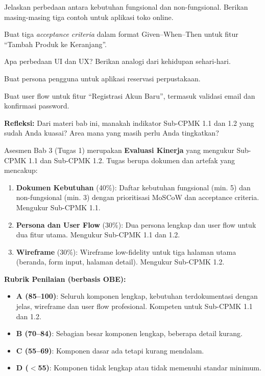 \documentclass[../main.tex]{subfiles}
\begin{document}
\begin{latihan}
  \item Jelaskan perbedaan antara kebutuhan fungsional dan non-fungsional. Berikan masing-masing tiga contoh untuk aplikasi toko online.
  \item Buat tiga \textit{acceptance criteria} dalam format Given--When--Then untuk fitur ``Tambah Produk ke Keranjang''.
  \item Apa perbedaan UI dan UX? Berikan analogi dari kehidupan sehari-hari.
  \item Buat persona pengguna untuk aplikasi reservasi perpustakaan.
  \item Buat user flow untuk fitur ``Registrasi Akun Baru'', termasuk validasi email dan konfirmasi password.
  \item \textbf{Refleksi:} Dari materi bab ini, manakah indikator Sub-CPMK 1.1 dan 1.2 yang sudah Anda kuasai? Area mana yang masih perlu Anda tingkatkan?
\end{latihan}

\begin{asesmen}
Asesmen Bab 3 (Tugas 1) merupakan \textbf{Evaluasi Kinerja} yang mengukur Sub-CPMK 1.1 dan Sub-CPMK 1.2. Tugas berupa dokumen dan artefak yang mencakup:
\begin{enumerate}
  \item \textbf{Dokumen Kebutuhan} (40\%): Daftar kebutuhan fungsional (min. 5) dan non-fungsional (min. 3) dengan prioritisasi MoSCoW dan acceptance criteria. Mengukur Sub-CPMK 1.1.
  \item \textbf{Persona dan User Flow} (30\%): Dua persona lengkap dan user flow untuk dua fitur utama. Mengukur Sub-CPMK 1.1 dan 1.2.
  \item \textbf{Wireframe} (30\%): Wireframe low-fidelity untuk tiga halaman utama (beranda, form input, halaman detail). Mengukur Sub-CPMK 1.2.
\end{enumerate}

\textbf{Rubrik Penilaian (berbasis OBE):}
\begin{itemize}
  \item \textbf{A (85--100)}: Seluruh komponen lengkap, kebutuhan terdokumentasi dengan jelas, wireframe dan user flow profesional. Kompeten untuk Sub-CPMK 1.1 dan 1.2.
  \item \textbf{B (70--84)}: Sebagian besar komponen lengkap, beberapa detail kurang.
  \item \textbf{C (55--69)}: Komponen dasar ada tetapi kurang mendalam.
  \item \textbf{D ($<$55)}: Komponen tidak lengkap atau tidak memenuhi standar minimum.
\end{itemize}
\end{asesmen}
\end{document}
